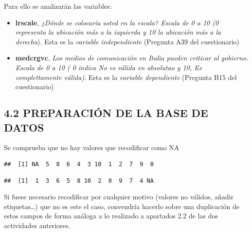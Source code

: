 \documentclass[
  12 pt,
  a4paper,
]{article}
\newenvironment{Shaded}{\begin{snugshade}}{\end{snugshade}}
\newcommand{\FunctionTok}[1]{\textcolor[rgb]{0.13,0.29,0.53}{\textbf{#1}}}
\newcommand{\NormalTok}[1]{#1}
\newcommand{\SpecialCharTok}[1]{\textcolor[rgb]{0.81,0.36,0.00}{\textbf{#1}}}
\begin{document}
Para ello se analizarán las variables:

\begin{itemize}
\item
  \textbf{lrscale}, \emph{¿Dónde se colocaría usted en la escala? Escala
  de 0 a 10 (0 representa la ubicación más a la izquierda y 10 la
  ubicación más a la derecha}). Esta es la \emph{variable independiente}
  (Pregunta A39 del cuestionario)
\item
  \textbf{medcrgvc}, \emph{Los medios de comunicación en Italia pueden
  criticar al gobierno. Escala de 0 a 10 ( 0 indica No es válida en
  absolutao y 10, Es complettamente válida)}. Esta es la \emph{variable
  dependiente} (Pregunta B15 del cuestionario)
\end{itemize}

\subsection{4.2 PREPARACIÓN DE LA BASE DE
DATOS}\label{preparaciuxf3n-de-la-base-de-datos-1}

Se comprueba que no hay valores que recodificar como NA

\begin{Shaded}
\end{Shaded}

\begin{verbatim}
##  [1] NA  5  8  6  4  3 10  1  2  7  9  0
\end{verbatim}

\begin{Shaded}
\end{Shaded}

\begin{verbatim}
##  [1]  1  3  6  5  8 10  2  0  9  7  4 NA
\end{verbatim}

Si fuese necesario recodificar por cualquier motivo (valores no válidos,
añadir etiquetas\ldots) que no es este el caso, convendría hacerlo sobre
una duplicación de estos campos de forma análoga a lo realizado a
apartados 2.2 de las dos actividades anteriores.
\end{document}
